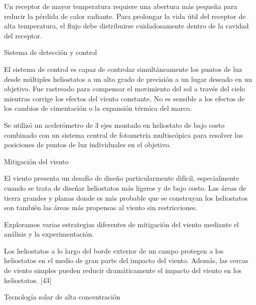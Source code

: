 \documentclass[12pt]{article}
\begin{document}
Un receptor de mayor temperatura requiere una abertura más pequeña para reducir la pérdida de calor radiante. Para prolongar la vida útil del receptor de alta temperatura, el flujo debe distribuirse cuidadosamente dentro de la cavidad del receptor.

Sistema de detección y control

El sistema de control es capaz de controlar simultáneamente los puntos de luz desde múltiples heliostatos a un alto grado de precisión a un lugar deseado en un objetivo. Fue rastreado para compensar el movimiento del sol a través del cielo mientras corrige los efectos del viento constante. No es sensible a los efectos de los cambios de cimentación o la expansión térmica del marco.

Se utilizó un acelerómetro de 3 ejes montado en heliostato de bajo costo combinado con un sistema central de fotometría multiscópica para resolver las posiciones de puntos de luz individuales en el objetivo.

Mitigación del viento

El viento presenta un desafío de diseño particularmente difícil, especialmente cuando se trata de diseñar heliostatos más ligeros y de bajo costo. Las áreas de tierra grandes y planas donde es más probable que se construyan los heliostatos son también las áreas más propensas al viento sin restricciones.

Exploramos varias estrategias diferentes de mitigación del viento mediante el análisis y la experimentación.

Los heliostatos a lo largo del borde exterior de un campo protegen a los heliostatos en el medio de gran parte del impacto del viento. Además, las cercas de viento simples pueden reducir dramáticamente el impacto del viento en los heliostatos. [43]



Tecnología solar de alta concentración
\end{document}
